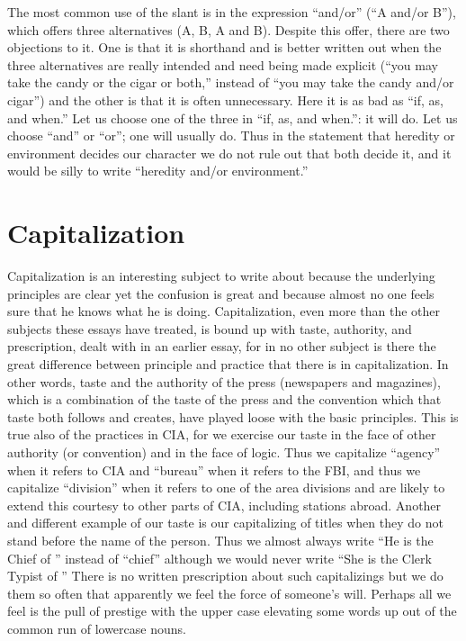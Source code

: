 \documentclass[
    oneside,
    11pt,
]{memoir}
\begin{document}
The most common use of the slant is in the expression \enquote{and/or} (\enquote{A and/or B}), which offers three alternatives (A, B, A and B). Despite this offer, there are two objections to it. One is that it is shorthand and is better written out when the three alternatives are really intended and need being made explicit (\enquote{you may take the candy or the cigar or both,} instead of \enquote{you may take the candy and/or cigar}) and the other is that it is often unnecessary. Here it is as bad as \enquote{if, as, and when.} Let us choose one of the three in \enquote{if, as, and when.}: it will do. Let us choose \enquote{and} or \enquote{or}; one will usually do. Thus in the statement that heredity or environment decides our character we do not rule out that both decide it, and it would be silly to write \enquote{heredity and/or environment.}

\chapter{Capitalization}

Capitalization is an interesting subject to write about because the underlying principles are clear yet the confusion is great and because almost no one feels sure that he knows what he is doing. Capitalization, even more than the other subjects these essays have treated, is bound up with taste, authority, and prescription, dealt with in an earlier essay, for in no other subject is there the great difference between principle and practice that there is in capitalization. In other words, taste and the authority of the press (newspapers and magazines), which is a combination of the taste of the press and the convention which that taste both follows and creates, have played loose with the basic principles. This is true also of the practices in CIA, for we exercise our taste in the face of other authority (or convention) and in the face of logic. Thus we capitalize \enquote{agency} when it refers to CIA and \enquote{bureau} when it refers to the FBI, and thus we capitalize \enquote{division} when it refers to one of the area divisions and are likely to extend this courtesy to other parts of CIA, including stations abroad. Another and different example of our taste is our capitalizing of titles when they do not stand before the name of the person. Thus we almost always write \enquote{He is the Chief of } instead of \enquote{chief} although we would never write \enquote{She is the Clerk Typist of } There is no written prescription about such capitalizings but we do them so often that apparently we feel the force of someone's will. Perhaps all we feel is the pull of prestige with the upper case elevating some words up out of the common run of lowercase nouns.
\end{document}
